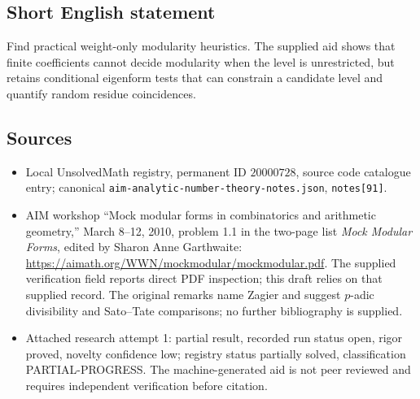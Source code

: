\documentclass[11pt]{article}
\begin{document}
\subsection{Short English statement}
Find practical weight-only modularity heuristics. The supplied aid shows that finite coefficients cannot decide modularity when the level is unrestricted, but retains conditional eigenform tests that can constrain a candidate level and quantify random residue coincidences.
\subsection{Sources}
\begin{itemize}
\item Local UnsolvedMath registry, permanent ID $20000728$, source code catalogue entry; canonical \texttt{aim-analytic-number-theory-notes.json}, \texttt{notes[91]}.
\item AIM workshop ``Mock modular forms in combinatorics and arithmetic geometry,'' March 8--12, 2010, problem 1.1 in the two-page list \emph{Mock Modular Forms}, edited by Sharon Anne Garthwaite: \url{https://aimath.org/WWN/mockmodular/mockmodular.pdf}. The supplied verification field reports direct PDF inspection; this draft relies on that supplied record. The original remarks name Zagier and suggest $p$-adic divisibility and Sato--Tate comparisons; no further bibliography is supplied.
\item Attached research attempt 1: partial result, recorded run status open, rigor proved, novelty confidence low; registry status partially solved, classification PARTIAL-PROGRESS. The machine-generated aid is not peer reviewed and requires independent verification before citation.
\end{itemize}
\end{document}
